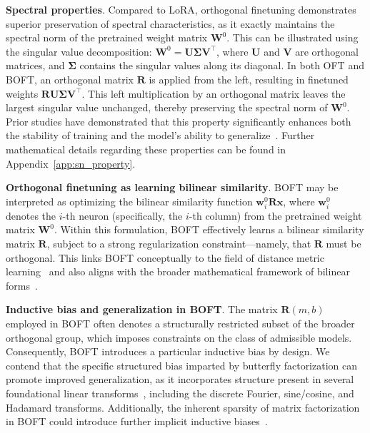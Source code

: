 \textbf{Spectral properties}. Compared to LoRA, orthogonal finetuning demonstrates superior preservation of spectral characteristics, as it exactly maintains the spectral norm of the pretrained weight matrix $\bm{W}^0$. This can be illustrated using the singular value decomposition: $\bm{W}^0=\bm{U}\bm{\Sigma}\bm{V}^\top$, where $\bm{U}$ and $\bm{V}$ are orthogonal matrices, and $\bm{\Sigma}$ contains the singular values along its diagonal. In both OFT and BOFT, an orthogonal matrix $\bm{R}$ is applied from the left, resulting in finetuned weights $\bm{R}\bm{U}\bm{\Sigma}\bm{V}^\top$. This left multiplication by an orthogonal matrix leaves the largest singular value unchanged, thereby preserving the spectral norm of $\bm{W}^0$. Prior studies have demonstrated that this property significantly enhances both the stability of training and the model's ability to generalize~\cite{miyato2018spectral,yoshida2017spectral}. Further mathematical details regarding these properties can be found in Appendix~\ref{app:sn_property}.

\textbf{Orthogonal finetuning as learning bilinear similarity}. BOFT may be interpreted as optimizing the bilinear similarity function $\bm{w}^0_i\bm{R}\bm{x}$, where $\bm{w}^0_i$ denotes the $i$-th neuron (specifically, the $i$-th column) from the pretrained weight matrix $\bm{W}^0$. Within this formulation, BOFT effectively learns a bilinear similarity matrix $\bm{R}$, subject to a strong regularization constraint—namely, that $\bm{R}$ must be orthogonal. This links BOFT conceptually to the field of distance metric learning~\cite{xing2002distance} and also aligns with the broader mathematical framework of bilinear forms~\cite{roman2005advanced}.

\textbf{Inductive bias and generalization in BOFT}. The matrix $\bm{R}(m,b)$ employed in BOFT often denotes a structurally restricted subset of the broader orthogonal group, which imposes constraints on the class of admissible models. Consequently, BOFT introduces a particular inductive bias by design. We contend that the specific structured bias imparted by butterfly factorization can promote improved generalization, as it incorporates structure present in several foundational linear transforms~\cite{dao2019kaleidoscope}, including the discrete Fourier, sine/cosine, and Hadamard transforms. Additionally, the inherent sparsity of matrix factorization in BOFT could introduce further implicit inductive biases~\cite{gunasekar2017implicit,li2018algorithmic,liu2019neural}.

